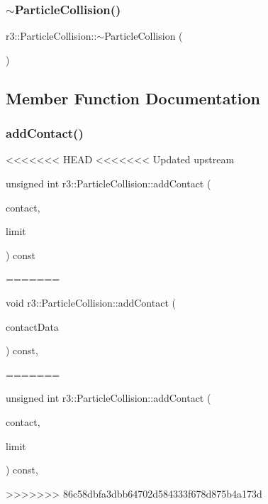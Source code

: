 \subsubsection{\texorpdfstring{$\sim$\+Particle\+Collision()}{~ParticleCollision()}}
{\footnotesize\ttfamily r3\+::\+Particle\+Collision\+::$\sim$\+Particle\+Collision (\begin{DoxyParamCaption}{ }\end{DoxyParamCaption})\hspace{0.3cm}{\ttfamily [default]}}



\subsection{Member Function Documentation}
\mbox{\label{classr3_1_1_particle_collision_adb77c85cb90707073e7c654acb2e6719}} 
\subsubsection{\texorpdfstring{add\+Contact()}{addContact()}}
<<<<<<< HEAD
<<<<<<< Updated upstream
{\footnotesize\ttfamily unsigned int r3\+::\+Particle\+Collision\+::add\+Contact (\begin{DoxyParamCaption}\item[{\mbox{\hyperlink{classr3_1_1_particle_contact}{Particle\+Contact}} $\ast$}]{contact,  }\item[{unsigned}]{limit }\end{DoxyParamCaption}) const\hspace{0.3cm}{\ttfamily [override]}}
=======
{\footnotesize\ttfamily void r3\+::\+Particle\+Collision\+::add\+Contact (\begin{DoxyParamCaption}\item[{\mbox{\hyperlink{classr3_1_1_fixed_size_container}{Fixed\+Size\+Container}}$<$ \mbox{\hyperlink{classr3_1_1_particle_contact}{Particle\+Contact}} $>$ \&}]{contact\+Data }\end{DoxyParamCaption}) const\hspace{0.3cm}{\ttfamily [override]}, {\ttfamily [virtual]}}
=======
{\footnotesize\ttfamily unsigned int r3\+::\+Particle\+Collision\+::add\+Contact (\begin{DoxyParamCaption}\item[{\mbox{\hyperlink{classr3_1_1_particle_contact}{Particle\+Contact}} $\ast$}]{contact,  }\item[{unsigned}]{limit }\end{DoxyParamCaption}) const\hspace{0.3cm}{\ttfamily [override]}, {\ttfamily [virtual]}}
>>>>>>> 86c58dbfa3dbb64702d584333f678d875b4a173d



